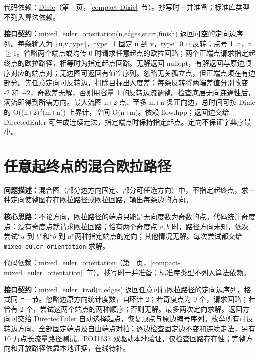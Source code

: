 代码依赖：\hyperref[compact-Dinic]{Dinic}（第~\pageref{compact-Dinic}~页，\ref{compact-Dinic}~节）。抄写时一并准备；标准库类型不列入算法依赖。

{\sloppy{}\noindent\textbf{接口契约：}mixed\_euler\_orientation(n,edges,start,finish) 返回可空的定向边序列。每条输入为 \{u,v,type\}，type=1 固定 u 到 v，type=0 可反转；点号 1..n，n$\ge$1。省略两个端点或均传 0 时请求任意起点的欧拉回路；两个正端点请求指定起终点的欧拉路径，相等时为指定起点回路。无解返回 nullopt，有解返回与原边顺序对应的端点对；无边图可返回有值空序列。忽略无关孤立点，但正端点须在有边部分。先任意定向可反转边，扣除目标出入度差；每条反转将两端差值分别改变 -2 和 +2，奇数差无解，否则用容量 1 的反转边流调整。检查底层无向连通性后，满流即得到所需方向。最大流图 n+2 点、至多 m+n 条正向边，总时间可按 Dinic 的 O((n+2)$^{2}$(m+n)) 上界计，空间 O(n+m)。依赖 flow.hpp；返回边交给 DirectedEuler 可生成连续走法，指定端点时保持指定起点。定向不保证字典序最小。\par}

\Needspace{413pt}



\newpage



\Needspace{427pt}

\section{任意起终点的混合欧拉路径}\label{compact-mixed_euler_trail}

\noindent\textbf{问题描述：}\allowbreak 混合图（部分边方向固定、部分可任选方向）中，不指定起终点，求一种定向使整图存在欧拉路径或欧拉回路，输出每条边的方向。

\textbf{核心思路：}\allowbreak 不论方向，欧拉路径的端点只能是无向度数为奇数的点。代码统计奇度点：没有奇度点就请求欧拉回路；恰有两个奇度点 $a,b$ 时，路径方向未知，依次尝试“$a$ 到 $b$”和“$b$ 到 $a$”两种指定端点的定向；其他情况无解。每次尝试都交给 \texttt{mixed\_euler\_orientation} 求解。

代码依赖：\hyperref[compact-mixed_euler_orientation]{mixed\_\allowbreak{}euler\_\allowbreak{}orientation}（第~\pageref{compact-mixed_euler_orientation}~页，\ref{compact-mixed_euler_orientation}~节）。抄写时一并准备；标准库类型不列入算法依赖。

{\sloppy{}\noindent\textbf{接口契约：}mixed\_euler\_trail(n,edges) 返回任意可行欧拉路径的定向边序列，格式同上一节。忽略边原方向统计度数，自环计 2；若奇度点为 0 个，请求回路；若恰有 2 个，尝试这两个端点的两种顺序；否则无解。最多两次定向求解。返回方向可交给 DirectedEuler 自动选择起点，恢复顶点与原边编号序列。枚举所有可反转边方向、全部固定端点及自由端点对拍；逐边检查固定边不变和连续走法，另有 10 万点长流量路径测试。POJ1637 双驱动本地验证，仅检查回路存在性；完整方向和开放路径依靠本地证据，在线待补。\par}

